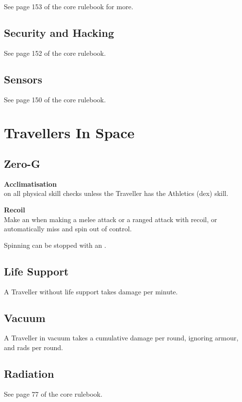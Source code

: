 \documentclass{cheatsheet}
\begin{document}
\begin{multicols}{3}
See page 153 of the core rulebook for more.

\subsection{Security and Hacking}

See page 152 of the core rulebook.

\subsection{Sensors}

See page 150 of the core rulebook.
\end{multicols}

\section{Travellers In Space}

\begin{multicols}{3}
\subsection{Zero-G}
\textbf{Acclimatisation}\\
 on all physical skill checks unless the Traveller has the
Athletics (dex) skill.

\textbf{Recoil}\\
Make an  when making a melee attack or a
ranged attack with recoil, or automatically miss and spin out of
control.

Spinning can be stopped with an .

\subsection{Life Support}
A Traveller without life support takes  damage per minute.

\subsection{Vacuum}
A Traveller in vacuum takes a cumulative  damage per round,
ignoring armour, and  rads per round.

\subsection{Radiation}
See page 77 of the core rulebook.
\end{multicols}
\end{document}
